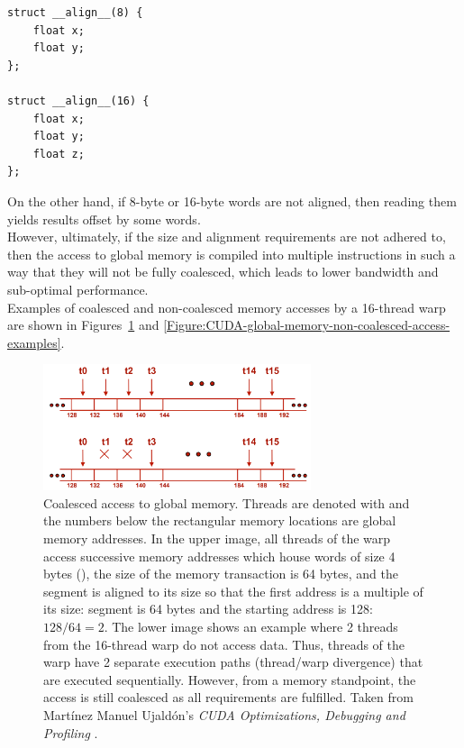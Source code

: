 \begin{lstlisting}[caption={Declaration of to-be-aligned 8- and 16-byte structures. The lower example is aligned to 16 bytes as 12-byte alignment (3 4-byte floats) is not coalesced, therefore, 4 bytes are used for padding. Taken from Nvidia's \emph{CUDA C++ Programming Guide} \cite{NVIDIAMay2022}.},label={Listing:CUDA-aligned-structure-declaration}]
struct __align__(8) {
	float x;
	float y;
};

struct __align__(16) {
	float x;
	float y;
	float z;
};
\end{lstlisting}

On the other hand, if 8-byte or 16-byte words are not aligned, then reading them yields results offset by some words. \\
However, ultimately, if the size and alignment requirements are not adhered to, then the access to global memory is compiled into multiple instructions in such a way that they will not be fully coalesced, which leads to lower bandwidth and sub-optimal performance. \\
Examples of coalesced and non-coalesced memory accesses by a 16-thread warp are shown in Figures~\ref{Figure:CUDA-global-memory-coalesced-access} and \ref{Figure:CUDA-global-memory-non-coalesced-access-examples}.

\begin{figure}[h!]
	\centering
	\includegraphics[width=0.7\textwidth, keepaspectratio]{images/ch1/CUDA_global_memory_coalesced_access.png}
	\caption{Coalesced access to global memory. Threads are denoted with  and the numbers below the rectangular memory locations are global memory addresses. In the upper image, all threads of the warp access successive memory addresses which house words of size 4 bytes (), the size of the memory transaction is 64 bytes, and the segment is aligned to its size so that the first address is a multiple of its size: segment is 64 bytes and the starting address is 128: $ 128/64 = 2 $. The lower image shows an example where 2 threads from the 16-thread warp do not access data. Thus, threads of the warp have 2 separate execution paths (thread/warp divergence) that are executed sequentially. However, from a memory standpoint, the access is still coalesced as all requirements are fulfilled. Taken from Martínez Manuel Ujaldón's \emph{CUDA Optimizations, Debugging and Profiling} \cite{xUOrKLpxlGjvTonr}.}
	\label{Figure:CUDA-global-memory-coalesced-access}
\end{figure}

